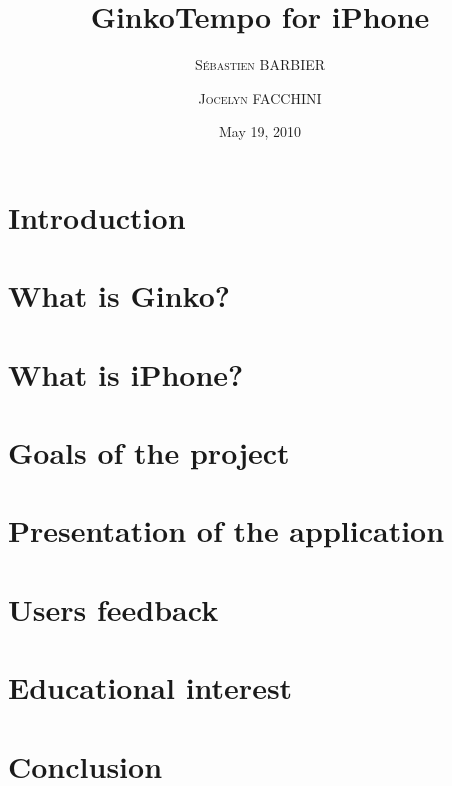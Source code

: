 \documentclass[a4paper, 12pt]{report}
\title{GinkoTempo for iPhone}
\date{May 19, 2010}
\author{\textsc{S\'{e}bastien BARBIER} \and \textsc{Jocelyn FACCHINI}}
\begin{document}
\maketitle

\tableofcontents

\chapter{Introduction}

\chapter{What is Ginko?}
\chapter{What is iPhone?}
\chapter{Goals of the project}

\chapter{Presentation of the application}

\chapter{Users feedback}
\chapter{Educational interest}

\chapter{Conclusion}
\end{document}
